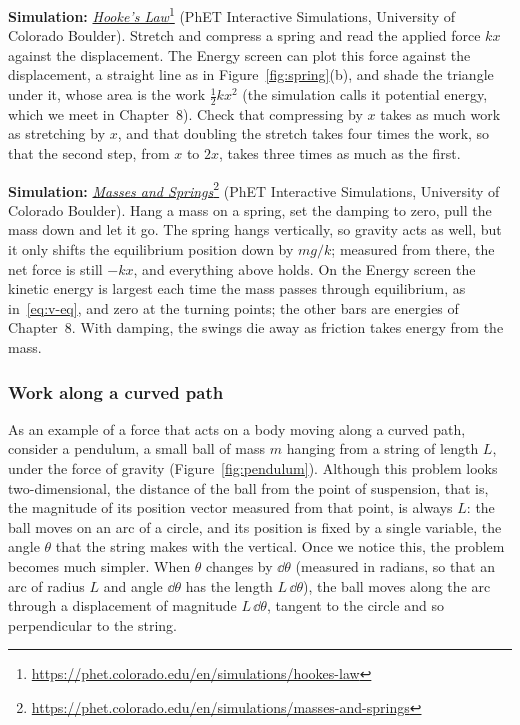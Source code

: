 \documentclass[11pt,a4paper]{article}
\begin{document}
\begin{aside}
\textbf{Simulation:}
\href{https://phet.colorado.edu/en/simulations/hookes-law}{\emph{Hooke's
Law}}\footnote{\url{https://phet.colorado.edu/en/simulations/hookes-law}} (PhET Interactive
Simulations, University of Colorado Boulder). Stretch and compress a spring and read the applied
force $kx$ against the displacement. The Energy screen can plot this force against the
displacement, a straight line as in Figure~\ref{fig:spring}(b), and shade the triangle under it,
whose area is the work $\frac12 kx^2$ (the simulation calls it potential energy, which we meet in
Chapter~8). Check that compressing by $x$ takes as much work as stretching by $x$, and that
doubling the stretch takes four times the work, so that the second step, from $x$ to $2x$, takes
three times as much as the first.
\par\smallskip
\textbf{Simulation:}
\href{https://phet.colorado.edu/en/simulations/masses-and-springs}{\emph{Masses and
Springs}}\footnote{\url{https://phet.colorado.edu/en/simulations/masses-and-springs}} (PhET
Interactive Simulations, University of Colorado Boulder). Hang a mass on a spring, set the damping
to zero, pull the mass down and let it go. The spring hangs vertically, so gravity acts as well, but
it only shifts the equilibrium position down by $mg/k$; measured from there, the net force is still
$-kx$, and everything above holds. On the Energy screen the kinetic energy is largest each time the
mass passes through equilibrium, as in~\eqref{eq:v-eq}, and zero at the turning points; the other
bars are energies of Chapter~8. With damping, the swings die away as friction takes energy from the
mass.
\end{aside}

\subsubsection*{Work along a curved path}

As an example of a force that acts on a body moving along a curved path, consider a pendulum, a small
ball of mass $m$ hanging from a string of length $L$, under the force of gravity
(Figure~\ref{fig:pendulum}). Although this problem looks two-dimensional, the distance of the ball
from the point of suspension, that is, the magnitude of its position vector measured from that point,
is always $L$: the ball moves on an arc of a circle, and its position is fixed by a single variable,
the angle $\theta$ that the string makes with the vertical. Once we notice this, the problem becomes
much simpler. When $\theta$ changes by $\dd\theta$ (measured in radians, so that an arc of radius
$L$ and angle $\dd\theta$ has the length $L\,\dd\theta$), the ball moves along the arc through a
displacement of magnitude $L\,\dd\theta$, tangent to the circle and so perpendicular to the string.
\end{document}
